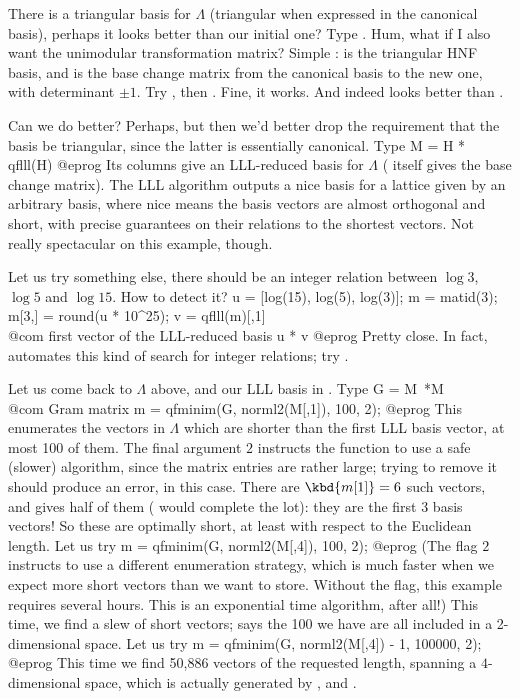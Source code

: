 There is a triangular basis for $\Lambda$ (triangular when expressed in
the canonical basis), perhaps it looks better than our initial one? Type
. Hum, what if I also want the unimodular transformation
matrix? Simple :   is the triangular HNF
basis, and  is the base change matrix from the canonical basis to
the new one, with determinant $\pm 1$. Try ,
then . Fine, it works. And  indeed looks
better than .

Can we do better? Perhaps, but then we'd better drop the requirement that
the basis be triangular, since the latter is essentially canonical. Type
\bprog
  M = H * qflll(H)
@eprog
Its columns give an LLL-reduced basis for $\Lambda$ ( itself
gives the base change matrix). The LLL algorithm outputs a nice basis for a
lattice given by an arbitrary basis, where nice means the basis vectors are
almost orthogonal and short, with precise guarantees on their relations to
the shortest vectors. Not really spectacular on this example, though.

Let us try something else, there should be an integer relation between
$\log 3$, $\log 5$ and $\log 15$. How to detect it?
\bprog
  u = [log(15), log(5), log(3)];
  m = matid(3); m[3,] = round(u * 10^25);
  v = qflll(m)[,1] \\@com first vector of the LLL-reduced basis
  u * v
@eprog\noindent
Pretty close. In fact,  automates this kind of search for integer
relations; try .

Let us come back to $\Lambda$ above, and our LLL basis in . Type
\bprog
  G = M~*M  \\@com Gram matrix
  m = qfminim(G, norml2(M[,1]), 100, 2);
@eprog\noindent
This enumerates the vectors in $\Lambda$ which are shorter than the first LLL
basis vector, at most 100 of them. The final argument $2$ instructs the
function to use a safe (slower) algorithm, since the matrix entries are
rather large; trying to remove it should produce an error, in this case.
There are $\kbd{m[1]} = 6$ such vectors, and  gives half of them
( would complete the lot): they are the first 3 basis vectors! So
these are optimally short, at least with respect to the Euclidean length. Let
us try
\bprog
  m = qfminim(G, norml2(M[,4]), 100, 2);
@eprog\noindent
(The flag $2$ instructs  to use a different enumeration
strategy, which is much faster when we expect more short vectors than we want
to store. Without the flag, this example requires several hours. This is an
exponential time algorithm, after all!) This time, we find a slew of short
vectors;  says the 100 we have are all included in a
2-dimensional space. Let us try
\bprog
  m = qfminim(G, norml2(M[,4]) - 1, 100000, 2);
@eprog\noindent
This time we find 50,886 vectors of the requested length, spanning a
$4$-dimensional space, which is actually generated by ,
  and .

